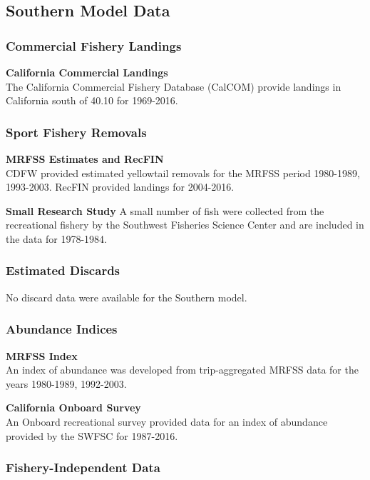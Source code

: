 \documentclass[12pt,]{article}
\begin{document}
\subsection{Southern Model Data}\label{southern-model-data}

\subsubsection{Commercial Fishery
Landings}\label{commercial-fishery-landings-1}

\textbf{California Commercial Landings}\\
The California Commercial Fishery Database (CalCOM) provide landings in
California south of 40.10 for 1969-2016.

\subsubsection{Sport Fishery Removals}\label{sport-fishery-removals-1}

\textbf{MRFSS Estimates and RecFIN}\\
CDFW provided estimated yellowtail removals for the MRFSS period
1980-1989, 1993-2003. RecFIN provided landings for 2004-2016.

\textbf{Small Research Study} A small number of fish were collected from
the recreational fishery by the Southwest Fisheries Science Center and
are included in the data for 1978-1984.

\subsubsection{Estimated Discards}\label{estimated-discards-1}

No discard data were available for the Southern model.

\subsubsection{Abundance Indices}\label{abundance-indices-1}

\textbf{MRFSS Index}\\
An index of abundance was developed from trip-aggregated MRFSS data for
the years 1980-1989, 1992-2003.

\textbf{California Onboard Survey}\\
An Onboard recreational survey provided data for an index of abundance
provided by the SWFSC for 1987-2016.

\subsubsection{Fishery-Independent
Data}\label{fishery-independent-data-1}
\end{document}
